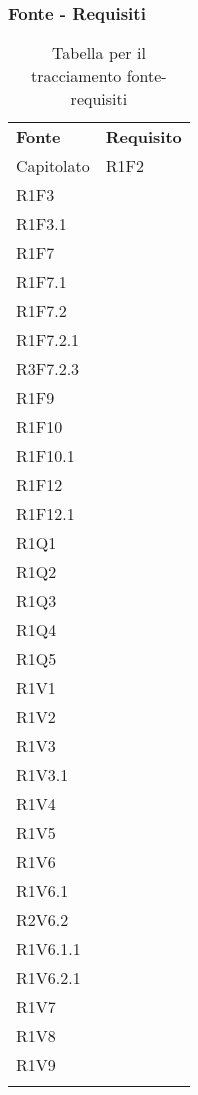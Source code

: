 \subsubsection{Fonte - Requisiti}

\renewcommand{\arraystretch}{2.2}

\begin{longtable}{|C{6.5cm}|C{6.5cm}|}
	
	\caption{Tabella per il tracciamento fonte-requisiti}\\
	\hline
	
	\textbf{Fonte} & \textbf{Requisito} 
	\tabularnewline
	\endhead
	
	Capitolato &  
	\centering
	R1F2\\
	R1F3 \\
	R1F3.1\\
	R1F7\\
	R1F7.1\\
	R1F7.2\\
	R1F7.2.1\\
	R3F7.2.3\\
	R1F9\\
	R1F10\\
	R1F10.1\\
	R1F12\\
	R1F12.1\\
	R1Q1\\
	R1Q2\\
	R1Q3\\
	R1Q4\\
	R1Q5\\
	R1V1\\
	R1V2\\
	R1V3\\
	R1V3.1\\
	R1V4\\
	R1V5\\
	R1V6\\
	R1V6.1\\
	R2V6.2\\
	R1V6.1.1\\
	R1V6.2.1\\
	R1V7\\
	R1V8\\
	R1V9\\
	
	\tabularnewline
	

\end{longtable}
